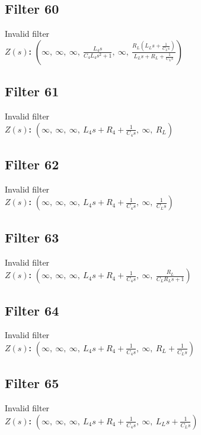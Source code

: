 \documentclass{article}
\begin{document}
\subsection*{Filter 60}
Invalid filter \\ 
\textbf{$Z(s)$:} $\left( \infty, \  \infty, \  \infty, \  \frac{L_{4} s}{C_{4} L_{4} s^{2} + 1}, \  \infty, \  \frac{R_{L} \left(L_{L} s + \frac{1}{C_{L} s}\right)}{L_{L} s + R_{L} + \frac{1}{C_{L} s}}\right)$ \\ 
\subsection*{Filter 61}
Invalid filter \\ 
\textbf{$Z(s)$:} $\left( \infty, \  \infty, \  \infty, \  L_{4} s + R_{4} + \frac{1}{C_{4} s}, \  \infty, \  R_{L}\right)$ \\ 
\subsection*{Filter 62}
Invalid filter \\ 
\textbf{$Z(s)$:} $\left( \infty, \  \infty, \  \infty, \  L_{4} s + R_{4} + \frac{1}{C_{4} s}, \  \infty, \  \frac{1}{C_{L} s}\right)$ \\ 
\subsection*{Filter 63}
Invalid filter \\ 
\textbf{$Z(s)$:} $\left( \infty, \  \infty, \  \infty, \  L_{4} s + R_{4} + \frac{1}{C_{4} s}, \  \infty, \  \frac{R_{L}}{C_{L} R_{L} s + 1}\right)$ \\ 
\subsection*{Filter 64}
Invalid filter \\ 
\textbf{$Z(s)$:} $\left( \infty, \  \infty, \  \infty, \  L_{4} s + R_{4} + \frac{1}{C_{4} s}, \  \infty, \  R_{L} + \frac{1}{C_{L} s}\right)$ \\ 
\subsection*{Filter 65}
Invalid filter \\ 
\textbf{$Z(s)$:} $\left( \infty, \  \infty, \  \infty, \  L_{4} s + R_{4} + \frac{1}{C_{4} s}, \  \infty, \  L_{L} s + \frac{1}{C_{L} s}\right)$ \\ 
\end{document}
